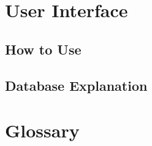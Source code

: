 \documentclass[12pt]{article}
\begin{document}
\section{User Interface}
\subsection{How to Use}
\subsection{Database Explanation}
\newpage

\section*{Glossary}
\begin{description}
    \item[] 
\end{description}
\newpage

\begin{thebibliography}{9}
\end{thebibliography}
\end{document}
